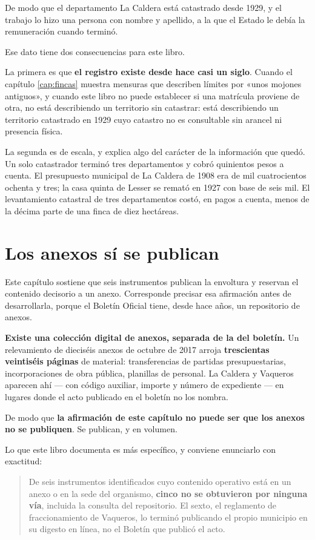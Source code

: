 De modo que el departamento La Caldera está catastrado desde 1929, y el trabajo lo hizo una
persona con nombre y apellido, a la que el Estado le debía la remuneración cuando terminó.

Ese dato tiene dos consecuencias para este libro.

La primera es que \textbf{el registro existe desde hace casi un siglo}. Cuando el capítulo \ref{cap:fincas} muestra mensuras que describen límites por «unos mojones antiguos», y cuando este libro
no puede establecer si una matrícula proviene de otra, no está describiendo un territorio
sin catastrar: está describiendo un territorio catastrado en 1929 cuyo catastro no es
consultable sin arancel ni presencia física.

La segunda es de escala, y explica algo del carácter de la información que quedó. Un solo
catastrador terminó tres departamentos y cobró quinientos pesos a cuenta. El presupuesto
municipal de La Caldera de 1908 era de mil cuatrocientos ochenta y tres; la casa quinta de
Lesser se remató en 1927 con base de seis mil. El levantamiento catastral de tres
departamentos costó, en pagos a cuenta, menos de la décima parte de una finca de diez
hectáreas.

\section{Los anexos sí se publican}

Este capítulo sostiene que seis instrumentos publican la envoltura y reservan el contenido
decisorio a un anexo. Corresponde precisar esa afirmación antes de desarrollarla, porque el
Boletín Oficial tiene, desde hace años, un repositorio de anexos.

\textbf{Existe una colección digital de anexos, separada de la del boletín.} Un relevamiento
de dieciséis anexos de octubre de 2017 arroja \textbf{trescientas veintiséis páginas} de
material: transferencias de partidas presupuestarias, incorporaciones de obra pública,
planillas de personal. La Caldera y Vaqueros aparecen ahí --- con código auxiliar, importe y
número de expediente --- en lugares donde el acto publicado en el boletín no los nombra.

De modo que \textbf{la afirmación de este capítulo no puede ser que los anexos no se
publiquen}. Se publican, y en volumen.

Lo que este libro documenta es más específico, y conviene enunciarlo con exactitud:

\begin{quote}
De seis instrumentos identificados cuyo contenido operativo está en un anexo o en la sede del organismo, \textbf{cinco no se obtuvieron por ninguna vía}, incluida la consulta
del repositorio. El sexto, el reglamento de fraccionamiento de Vaqueros, lo terminó publicando el propio municipio en su digesto en línea, no el Boletín que publicó el acto.
\end{quote}

